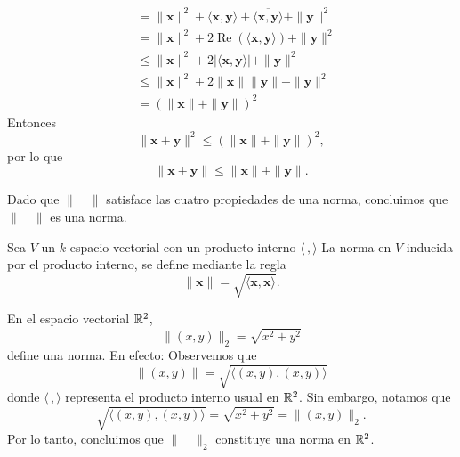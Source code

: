 \begin{example}
\begin{enumerate}[label=\roman*.]
\begin{align*}
            & = \| \mathbf{x} \|^2 + \langle \mathbf{x}, \mathbf{y} \rangle + \overline{\langle \mathbf{x}, \mathbf{y} \rangle} + \| \mathbf{y} \|^2 \\
            & = \| \mathbf{x} \|^2 + 2 \operatorname{Re} \left( \langle \mathbf{x}, \mathbf{y} \rangle \right) + \| \mathbf{y} \|^2 \\
            & \leq \| \mathbf{x} \|^2 + 2 \left| \langle \mathbf{x}, \mathbf{y} \rangle \right| + \| \mathbf{y} \|^2 \\
            & \leq \| \mathbf{x} \|^2 + 2 \| \mathbf{x} \| \| \mathbf{y} \| + \| \mathbf{y} \|^2 \\
            & = \left( \| \mathbf{x} \| + \| \mathbf{y} \| \right)^2
        \end{align*}
        Entonces
        $$\| \mathbf{x} + \mathbf{y} \|^2 \leq \left( \| \mathbf{x} \| + \| \mathbf{y} \| \right)^2,$$
        por lo que
        $$\| \mathbf{x} + \mathbf{y} \| \leq \| \mathbf{x} \| + \| \mathbf{y} \|.$$
    \end{enumerate}
    Dado que $\| \quad \|$ satisface las cuatro propiedades de una norma, concluimos que $\| \quad \|$ es una norma.
\end{example}

\newpage

\begin{definition}
    Sea $V$ un $k$-espacio vectorial con un producto interno $\langle \, , \rangle$ La norma en $V$ inducida por el producto interno, se define mediante la regla
    $$\| \mathbf{x} \| = \sqrt{\langle \mathbf{x}, \mathbf{x} \rangle}.$$
\end{definition}

\begin{example}
    En el espacio vectorial $\RR[2]$,
    $$\| (x, y) \|_2 = \sqrt{x^2 + y^2}$$
    define una norma. En efecto: Observemos que
    $$\| (x, y) \| = \sqrt{\langle (x, y), (x, y) \rangle}$$
    donde $\langle \, , \rangle$ representa el producto interno usual en $\RR[2]$. Sin embargo, notamos que
    $$\sqrt{\langle (x, y), (x, y) \rangle} = \sqrt{x^2 + y^2} = \| (x, y) \|_2.$$
    Por lo tanto, concluimos que $\| \quad \|_2$ constituye una norma en $\RR[2]$.
\end{example}